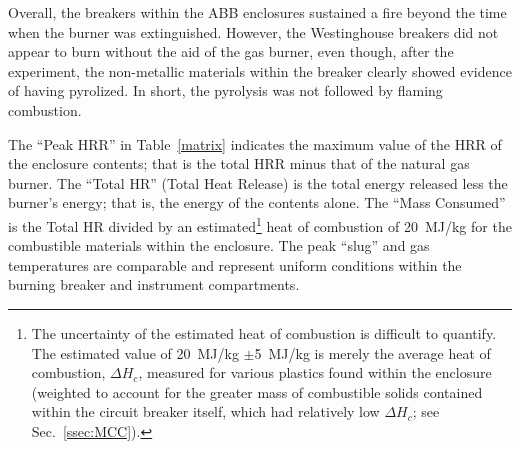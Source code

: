 Overall, the breakers within the ABB enclosures sustained a fire beyond the time when the burner was extinguished. However, the Westinghouse breakers did not appear to burn without the aid of the gas burner, even though, after the experiment, the non-metallic materials within the breaker clearly showed evidence of having pyrolized. In short, the pyrolysis was not followed by flaming combustion.

The ``Peak HRR'' in Table~\ref{matrix} indicates the maximum value of the HRR of the enclosure contents; that is the total HRR minus that of the natural gas burner. The ``Total HR'' (Total Heat Release) is the total energy released less the burner's energy; that is, the energy of the contents alone. The ``Mass Consumed'' is the Total HR divided by an estimated\footnote{The uncertainty of the estimated heat of combustion is difficult to quantify. The estimated value of 20~MJ/kg $\pm$5~MJ/kg is merely the average heat of combustion, $\Delta H_c$, measured for various plastics found within the enclosure (weighted to account for the greater mass of combustible solids contained within the circuit breaker itself, which had relatively low $\Delta H_c$; see Sec.~\ref{ssec:MCC}).} heat of combustion of 20~MJ/kg for the combustible materials within the enclosure. The peak ``slug'' and gas temperatures are comparable and represent uniform conditions within the burning breaker and instrument compartments.


